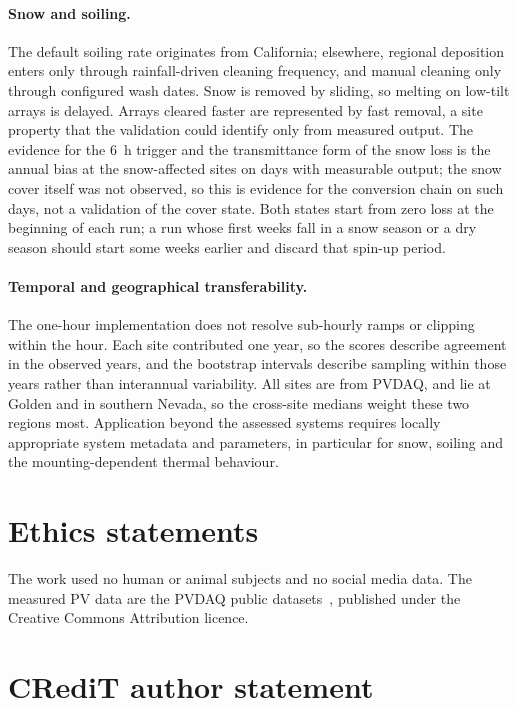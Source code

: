 \documentclass[11pt]{article}
\begin{document}
\paragraph{Snow and soiling.}
The default soiling rate originates from California; elsewhere, regional deposition enters only through rainfall-driven cleaning frequency, and manual cleaning only through configured wash dates. Snow is removed by sliding, so melting on low-tilt arrays is delayed. Arrays cleared faster are represented by fast removal, a site property that the validation could identify only from measured output. The evidence for the 6~h trigger and the transmittance form of the snow loss is the annual bias at the snow-affected sites on days with measurable output; the snow cover itself was not observed, so this is evidence for the conversion chain on such days, not a validation of the cover state. Both states start from zero loss at the beginning of each run; a run whose first weeks fall in a snow season or a dry season should start some weeks earlier and discard that spin-up period.

\paragraph{Temporal and geographical transferability.}
The one-hour implementation does not resolve sub-hourly ramps or clipping within the hour. Each site contributed one year, so the scores describe agreement in the observed years, and the bootstrap intervals describe sampling within those years rather than interannual variability. All sites are from PVDAQ, and \vNGolden{} lie at Golden and \vNDesert{} in southern Nevada, so the cross-site medians weight these two regions most. Application beyond the assessed systems requires locally appropriate system metadata and parameters, in particular for snow, soiling and the mounting-dependent thermal behaviour.

\section*{Ethics statements}

The work used no human or animal subjects and no social media data. The measured PV data are the PVDAQ public datasets~\cite{deline2021pvdaq}, published under the Creative Commons Attribution licence.

\section*{CRediT author statement}
\end{document}
